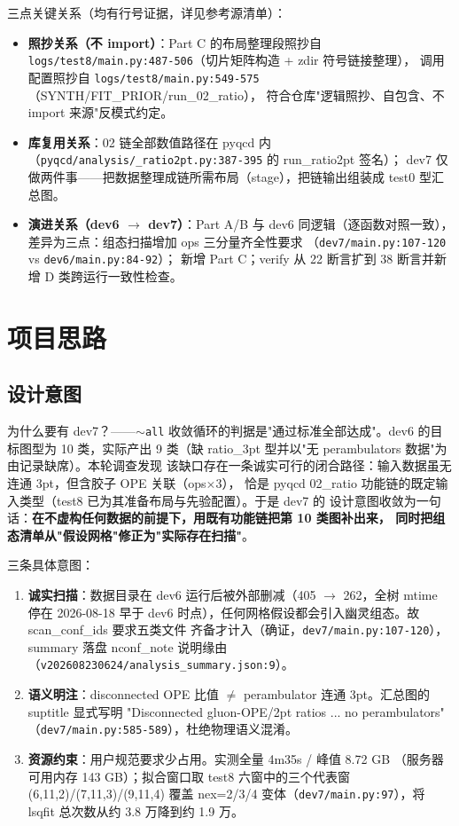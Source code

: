 \documentclass[UTF8]{ctexart}
\begin{document}
三点关键关系（均有行号证据，详见参考源清单）：
\begin{itemize}
\item \textbf{照抄关系（不 import）}：Part C 的布局整理段照抄自
\texttt{\nolinkurl{logs/test8/main.py:487-506}}（切片矩阵构造 + zdir 符号链接整理），
调用配置照抄自 \texttt{\nolinkurl{logs/test8/main.py:549-575}}（SYNTH/FIT\_PRIOR/run\_02\_ratio），
符合仓库"逻辑照抄、自包含、不 import 来源"反模式约定。
\item \textbf{库复用关系}：02 链全部数值路径在 pyqcd 内
（\texttt{\nolinkurl{pyqcd/analysis/\_ratio2pt.py:387-395}} 的 run\_ratio2pt 签名）；
dev7 仅做两件事——把数据整理成链所需布局（stage），把链输出组装成 test0 型汇总图。
\item \textbf{演进关系（dev6 $\to$ dev7）}：Part A/B 与 dev6 同逻辑（逐函数对照一致），
差异为三点：组态扫描增加 ops 三分量齐全性要求
（\texttt{\nolinkurl{dev7/main.py:107-120}} vs \texttt{\nolinkurl{dev6/main.py:84-92}}）；
新增 Part C；verify 从 22 断言扩到 38 断言并新增 D 类跨运行一致性检查。
\end{itemize}

\section{项目思路}
\subsection{设计意图}
\begin{ideabox}
为什么要有 dev7？——\texttt{$\sim$all} 收敛循环的判据是"通过标准全部达成"。dev6 的目标图型为
10 类，实际产出 9 类（缺 ratio\_3pt 型并以"无 perambulators 数据"为由记录缺席）。本轮调查发现
该缺口存在一条诚实可行的闭合路径：输入数据虽无连通 3pt，但含胶子 OPE 关联（ops$\times$3），
恰是 pyqcd 02\_ratio 功能链的既定输入类型（test8 已为其准备布局与先验配置）。于是 dev7 的
设计意图收敛为一句话：\textbf{在不虚构任何数据的前提下，用既有功能链把第 10 类图补出来，
同时把组态清单从"假设网格"修正为"实际存在扫描"}。
\end{ideabox}

三条具体意图：
\begin{enumerate}
\item \textbf{诚实扫描}：数据目录在 dev6 运行后被外部删减（405 $\to$ 262，全树 mtime 停在
2026-08-18 早于 dev6 时点），任何网格假设都会引入幽灵组态。故 scan\_conf\_ids 要求五类文件
齐备才计入（确证，\texttt{\nolinkurl{dev7/main.py:107-120}}），summary 落盘 nconf\_note 说明缘由
（\texttt{\nolinkurl{v202608230624/analysis\_summary.json:9}}）。
\item \textbf{语义明注}：disconnected OPE 比值 $\ne$ perambulator 连通 3pt。汇总图的 suptitle
显式写明 "Disconnected gluon-OPE/2pt ratios ... no perambulators"
（\texttt{\nolinkurl{dev7/main.py:585-589}}），杜绝物理语义混淆。
\item \textbf{资源约束}：用户规范要求少占用。实测全量 4m35s / 峰值 8.72 GB
（服务器可用内存 143 GB）；拟合窗口取 test8 六窗中的三个代表窗 (6,11,2)/(7,11,3)/(9,11,4)
覆盖 nex=2/3/4 变体（\texttt{\nolinkurl{dev7/main.py:97}}），将 lsqfit 总次数从约 3.8 万降到约 1.9 万。
\end{enumerate}
\end{document}
